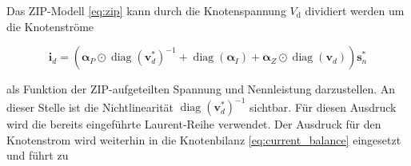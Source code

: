 Das ZIP-Modell \eqref{eq:zip} kann durch die Knotenspannung $V_\mathrm{d}$ dividiert werden um die Knotenströme 

\begin{equation}
	\label{eq:current_zip}
	\mathbf{i}_d = \left(\boldsymbol{\alpha}_P \odot \operatorname{diag}(\mathbf{v}_d^{*})^{-1} + \operatorname{diag}(\boldsymbol{\alpha}_I) + \boldsymbol{\alpha}_Z \odot \operatorname{diag}(\mathbf{v}_d)\right)\mathbf{s}_n^{*}
\end{equation}

als Funktion der ZIP-aufgeteilten Spannung und Nennleistung darzustellen.
An dieser Stelle ist die Nichtlinearität $\operatorname{diag}(\mathbf{v}_d^{*})^{-1}$ sichtbar. 
Für diesen Ausdruck wird die bereits eingeführte Laurent-Reihe verwendet. 
Der Ausdruck für den Knotenstrom wird weiterhin in die Knotenbilanz \eqref{eq:current_balance} eingesetzt und führt zu





